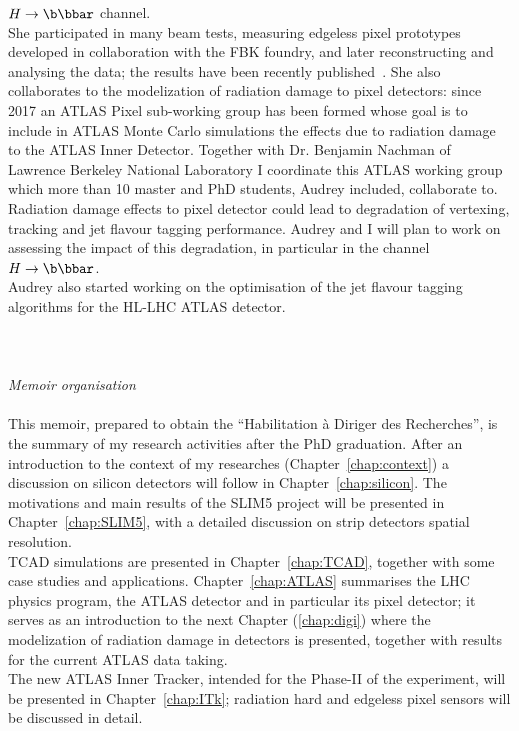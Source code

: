  $H\to\b\bbar$ channel.
\\She participated in many beam tests, measuring 
edgeless pixel prototypes developed in collaboration with the FBK foundry, and later reconstructing 
and analysing the data; the results have been recently published~\cite{1748-0221-12-05-P05006}. 
She also collaborates to the modelization of radiation damage to pixel detectors: since 2017 
an ATLAS Pixel sub-working group has been formed whose goal is to include in ATLAS Monte Carlo 
simulations the effects due to radiation damage to the ATLAS Inner Detector. Together 
with Dr. Benjamin Nachman of Lawrence Berkeley National Laboratory I coordinate this 
ATLAS working group  which more than 10 master and PhD students, Audrey included, collaborate to.
\\
Radiation damage effects to pixel detector could lead to degradation of vertexing, tracking 
and jet flavour tagging performance. Audrey and I will plan to work on assessing the impact of this 
degradation, in particular in the channel $H\to\b\bbar$. 
\\Audrey also started working on the optimisation of the jet flavour tagging algorithms for the
HL-LHC  ATLAS detector. 
\\
\\
\\
\\
{\it Memoir organisation}
\\
\\This memoir, prepared to obtain the ``Habilitation \`a Diriger des Recherches'', is the summary of my 
research activities after the PhD graduation. After an introduction to the context of my researches 
(Chapter~\ref{chap:context}) a discussion on silicon detectors will follow in Chapter~\ref{chap:silicon}.
The motivations and main results of the SLIM5 project will be presented in Chapter~\ref{chap:SLIM5}, 
with a detailed discussion on strip detectors spatial resolution.
\\TCAD simulations are presented in Chapter~\ref{chap:TCAD}, together with some case studies 
and applications.
Chapter~\ref{chap:ATLAS} summarises  the LHC physics program, the ATLAS detector and 
in particular its pixel detector; it serves as an introduction to the next Chapter (\ref{chap:digi}) where 
the modelization of radiation damage in detectors is presented, together with results for the 
current ATLAS data taking.
\\The new ATLAS Inner Tracker, intended for the Phase-II of the experiment, will be presented in 
Chapter~\ref{chap:ITk}; radiation hard and edgeless pixel sensors will be discussed in detail. 
